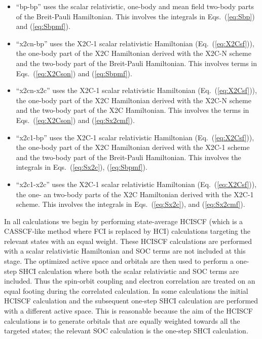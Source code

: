 \documentclass[10pt,aps,prb,twocolumn,amsmath,amssymb,superscriptaddress]{revtex4-1}
\begin{document}
\begin{itemize}
    \item ``bp-bp''    uses the scalar relativistic, one-body and mean field two-body parts of the Breit-Pauli Hamiltonian.
                       This involves the integrals in Eqs.~(\ref{eq:Sbp}) and (\ref{eq:Sbpmf}).
    \item ``x2cn-bp''  uses the X2C-1 scalar relativistic Hamiltonian (Eq.~(\ref{eq:X2Csf})), the one-body part of the X2C Hamiltonian derived with the X2C-N scheme and the two-body part of the Breit-Pauli Hamiltonian.
                       This involves terms in Eqs.~(\ref{eq:X2Cson}) and (\ref{eq:Sbpmf}).
    \item ``x2cn-x2c'' uses the X2C-1 scalar relativistic Hamiltonian (Eq.~(\ref{eq:X2Csf})), the one-body part of the X2C Hamiltonian derived with the X2C-N scheme and the two-body part of the X2C Hamiltonian.
                       This involves the terms in Eqs.~(\ref{eq:X2Cson}) and (\ref{eq:Sx2cmf}).
    \item ``x2c1-bp''  uses the X2C-1 scalar relativistic Hamiltonian (Eq.~(\ref{eq:X2Csf})), the one-body part of the X2C Hamiltonian derived with the X2C-1 scheme and the two-body part of the Breit-Pauli Hamiltonian.
                       This involves the integrals in Eqs.~(\ref{eq:Sx2c}), (\ref{eq:Sbpmf}).
    \item ``x2c1-x2c'' uses the X2C-1 scalar relativistic Hamiltonian (Eq.~(\ref{eq:X2Csf})), the one- an two-body parts of the X2C Hamiltonian derived with the X2C-1 scheme.
                       This involves the integrals in Eqs.~(\ref{eq:Sx2c}), and (\ref{eq:Sx2cmf}).
\end{itemize}

In all calculations we begin by performing state-average HCISCF\cite{hcicasscf} (which is a CASSCF-like method where FCI is replaced by HCI) calculations targeting the relevant states with an equal weight. These HCISCF calculations are performed with a scalar relativistic Hamiltonian and SOC terms are not included at this stage. The optimized active space and orbitals are then used to perform a one-step SHCI calculation where both the scalar relativistic and SOC terms are included. Thus the spin-orbit
coupling and electron correlation are treated on an equal footing during the correlated calculation. In some calculations the initial HCISCF calculation and the subsequent one-step SHCI calculation are performed with a different active space. This is reasonable because the aim of the HCISCF calculations is to generate orbitals that are equally weighted towards all the targeted states; the relevant SOC calculation is the one-step SHCI calculation. 
\end{document}
